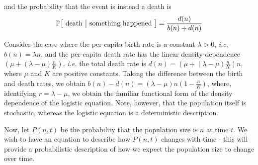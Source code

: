 and the probability that the event is instead a death is
\begin{equation*}
	\mathbb{P\big[\textrm{ death } \big{|} \textrm{ something happened }\big]} = \frac{d(n)}{b(n)+d(n)}
\end{equation*}
\begin{example}\label{ex_1D_stoch_logistic}
	Consider the case where the per-capita birth rate is a constant $\lambda > 0$, \emph{i.e}, $b(n) = \lambda n$, and the per-capita death rate has the linear density-dependence $\left(\mu + (\lambda-\mu)\frac{n}{K}\right)$, \emph{i.e.} the total death rate is $d(n) = \left(\mu + (\lambda-\mu)\frac{n}{K}\right)n$, where $\mu$ and $K$ are positive constants. Taking the difference between the birth and death rates, we obtain $b(n) - d(n) = (\lambda - \mu)n\left(1-\frac{n}{K}\right)$, where, identifying $r=\lambda-\mu$, we obtain the familiar functional form of the density dependence of the logistic equation. Note, however, that the population itself is stochastic, whereas the logistic equation is a deterministic description.
\end{example}
Now, let $P(n,t)$ be the probability that the population size is $n$ at time $t$. We wish to have an equation to describe how $P(n,t)$ changes with time - this will provide a probabilistic description of how we expect the population size to change over time.

